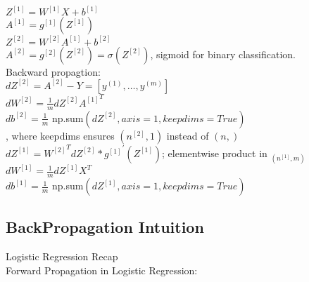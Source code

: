 \documentclass{article}
\begin{document}
$Z^{[1]} = W^{[1]} X + b^{[1]}$\\

$A^{[1]} = g^{[1]}(Z^{[1]})$\\

$Z^{[2]} = W^{[2]} A^{[1]} + b^{[2]}$\\

$A^{[2]} = g^{[2]}(Z^{[2]}) = \sigma(Z^{[2]})$, sigmoid for binary classification.\\


Backward propagtion:\\

$dZ^{[2]} = A^{[2]} - Y = [y^{(1)}, \dots,y^{(m)}]$\\

$dW^{[2]} = \frac{1}{m}dZ^{[2]} {A^{[1]}}^T$\\

$db^{[2]} = \frac{1}{m}$ np.sum$(dZ^{[2]}, axis=1, keepdims=True)$\\

    , where keepdims ensures $(n^{[2]}, 1)$ instead of $(n,)$\\

$dZ^{[1]} ={W^{[2]}}^T dZ^{[2]} * {g^{[1]}}^{'} (Z^{[1]})$; elementwise product in $_{(n^{[1]}, m)}$\\

$dW^{[1]} = \frac{1}{m}dZ^{[1]}X^T$\\

$db^{[1]} = \frac{1}{m}$ np.sum$(dZ^{[1]}, axis=1, keepdims=True)$\\


\newpage
\subsection{BackPropagation Intuition}

Logistic Regression Recap\\

Forward Propagation in Logistic Regression:\\

\end{document}
